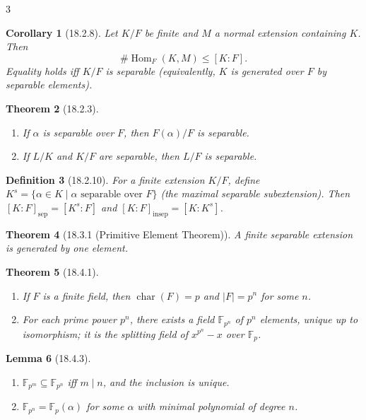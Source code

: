 \documentclass[10pt,landscape]{article}
\newtheorem{theorem}{Theorem}[section]
\newtheorem{definition}[theorem]{Definition}
\newtheorem{lemma}[theorem]{Lemma}
\newtheorem{corollary}[theorem]{Corollary}
\begin{document}
\begin{multicols}{3}
\begin{corollary}[18.2.8]
Let $K/F$ be finite and $M$ a normal extension containing $K$. Then
\[
\#\operatorname{Hom}_F(K,M) \le [K:F].
\]
Equality holds iff $K/F$ is separable (equivalently, $K$ is generated over $F$ by separable elements).
\end{corollary}

\begin{theorem}[18.2.3]
\begin{enumerate}
\item If $\alpha$ is separable over $F$, then $F(\alpha)/F$ is separable.
\item If $L/K$ and $K/F$ are separable, then $L/F$ is separable.
\end{enumerate}
\end{theorem}

\begin{definition}[18.2.10]
For a finite extension $K/F$, define $K^s = \{\alpha\in K\mid \alpha\text{ separable over }F\}$ (the maximal separable subextension). Then $[K:F]_{\text{sep}} = [K^s:F]$ and $[K:F]_{\text{insep}} = [K:K^s]$.
\end{definition}

\begin{theorem}[18.3.1 (Primitive Element Theorem)]
A finite separable extension is generated by one element.
\end{theorem}

\begin{theorem}[18.4.1]
\begin{enumerate}
\item If $F$ is a finite field, then $\operatorname{char}(F)=p$ and $|F|=p^n$ for some $n$.
\item For each prime power $p^n$, there exists a field $\mathbb{F}_{p^n}$ of $p^n$ elements, unique up to isomorphism; it is the splitting field of $x^{p^n}-x$ over $\mathbb{F}_p$.
\end{enumerate}
\end{theorem}

\begin{lemma}[18.4.3]
\begin{enumerate}
\item $\mathbb{F}_{p^m}\subseteq \mathbb{F}_{p^n}$ iff $m\mid n$, and the inclusion is unique.
\item $\mathbb{F}_{p^n} = \mathbb{F}_p(\alpha)$ for some $\alpha$ with minimal polynomial of degree $n$.
\end{enumerate}
\end{lemma}





\end{multicols}
\end{document}
